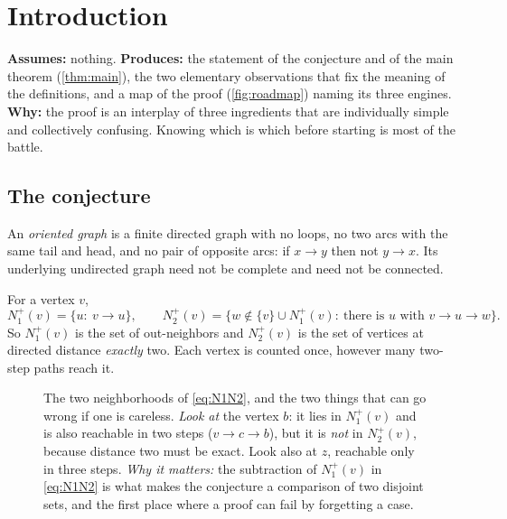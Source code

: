 \section{Introduction}\label{sec:intro}

\begin{contract}
\textbf{Assumes:} nothing. \quad
\textbf{Produces:} the statement of the conjecture and of the main theorem
(\cref{thm:main}), the two elementary observations that fix the meaning of the definitions, and a
map of the proof (\cref{fig:roadmap}) naming its three engines.\\[2pt]
\textbf{Why:} the proof is an interplay of three ingredients that are individually simple and
collectively confusing. Knowing which is which before starting is most of the battle.
\end{contract}

\subsection{The conjecture}

An \emph{oriented graph} is a finite directed graph with no loops, no two arcs with the same tail
and head, and no pair of opposite arcs: if $x\to y$ then not $y\to x$. Its underlying undirected
graph need not be complete and need not be connected.

For a vertex $v$,
\begin{equation}\label{eq:N1N2}
 N_1^+(v)=\{u:\ v\to u\},\qquad
 N_2^+(v)=\bigl\{w\notin\{v\}\cup N_1^+(v):\ \text{there is }u\text{ with }v\to u\to w\bigr\}.
\end{equation}
So $N_1^+(v)$ is the set of out-neighbors and $N_2^+(v)$ is the set of vertices at directed
distance \emph{exactly} two. Each vertex is counted once, however many two-step paths reach it.

\begin{figure}[t]
\centering

\caption{The two neighborhoods of \eqref{eq:N1N2}, and the two things that can go wrong if one is
 careless. \emph{Look at} the vertex $b$: it lies in $N_1^+(v)$ and is also reachable in two steps
 ($v\to c\to b$), but it is \emph{not} in $N_2^+(v)$, because distance two must be exact. Look
 also at $z$, reachable only in three steps. \emph{Why it matters:} the subtraction of $N_1^+(v)$
 in \eqref{eq:N1N2} is what makes the conjecture a comparison of two disjoint sets, and the first
 place where a proof can fail by forgetting a case.}
\label{fig:definitions}
\end{figure}

